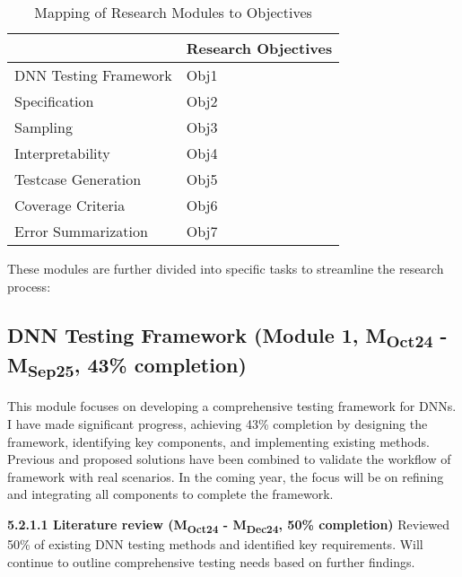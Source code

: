 \begin{table}[ht]
  \centering
  \renewcommand{\arraystretch}{1.5} %
  \begin{tabular}{|l|l|}
    \hline
    \rowcolor[HTML]{000000} 
    \multicolumn{1}{|c|}{\cellcolor[HTML]{000000}{\color[HTML]{FFFFFF} \textbf{Research Modules}}} & {\color[HTML]{FFFFFF} \textbf{Research Objectives}} \\ \hline
    {\color[HTML]{404040} DNN Testing Framework} & Obj1 \\ \hline
    {\color[HTML]{404040} Specification} & Obj2 \\ \hline
    {\color[HTML]{404040} Sampling} & Obj3 \\ \hline
    {\color[HTML]{404040} Interpretability} & Obj4 \\ \hline
    {\color[HTML]{404040} Testcase Generation} & Obj5 \\ \hline
    {\color[HTML]{404040} Coverage Criteria} & Obj6 \\ \hline
    Error Summarization & Obj7 \\ \hline
  \end{tabular}
  \caption{Mapping of Research Modules to Objectives}
  \label{table:modules}
\end{table}




These modules are further divided into specific tasks to streamline the research process:

\subsection{DNN Testing Framework (Module 1, M\textsubscript{Oct24} - M\textsubscript{Sep25}, 43\% completion)} \noindent This module focuses on developing a comprehensive testing framework for DNNs. I have made significant progress, achieving 43\% completion by designing the framework, identifying key components, and implementing existing methods. Previous and proposed solutions have been combined to validate the workflow of framework with real scenarios. In the coming year, the focus will be on refining and integrating all components to complete the framework.

\noindent \textbf{5.2.1.1 Literature review (M\textsubscript{Oct24} - M\textsubscript{Dec24}, 50\% completion)} Reviewed 50\% of existing DNN testing methods and identified key requirements. Will continue to outline comprehensive testing needs based on further findings.

